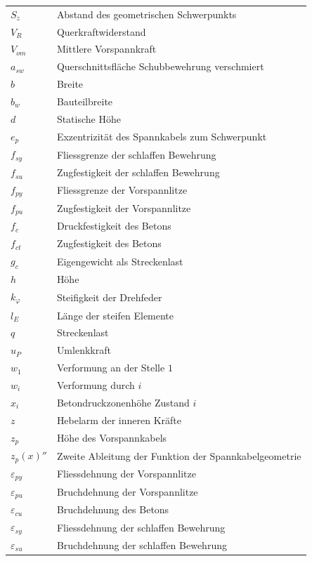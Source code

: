 \documentclass[
  11pt,
  letterpaper,
]{scrreprt}
\begin{document}
\begin{longtable}[]{@{}
  >{\raggedright\arraybackslash}p{}
  >{\raggedright\arraybackslash}p{}@{}}
\(S_{z}\) & Abstand des geometrischen Schwerpunkts \\
\(V_R\) & Querkraftwiderstand \\
\(V_{om}\) & Mittlere Vorspannkraft \\
\(a_{sw}\) & Querschnittsfläche Schubbewehrung verschmiert \\
\(b\) & Breite \\
\(b_w\) & Bauteilbreite \\
\(d\) & Statische Höhe \\
\(e_{p}\) & Exzentrizität des Spannkabels zum Schwerpunkt \\
\(f_{sy}\) & Fliessgrenze der schlaffen Bewehrung \\
\(f_{su}\) & Zugfestigkeit der schlaffen Bewehrung \\
\(f_{py}\) & Fliessgrenze der Vorspannlitze \\
\(f_{pu}\) & Zugfestigkeit der Vorspannlitze \\
\(f_{c}\) & Druckfestigkeit des Betons \\
\(f_{ct}\) & Zugfestigkeit des Betons \\
\(g_c\) & Eigengewicht als Streckenlast \\
\(h\) & Höhe \\
\(k_{\varphi}\) & Steifigkeit der Drehfeder \\
\(l_E\) & Länge der steifen Elemente \\
\(q\) & Streckenlast \\
\(u_P\) & Umlenkkraft \\
\(w_1\) & Verformung an der Stelle \(1\) \\
\(w_i\) & Verformung durch \(i\) \\
\(x_i\) & Betondruckzonenhöhe Zustand \(i\) \\
\(z\) & Hebelarm der inneren Kräfte \\
\(z_p\) & Höhe des Vorspannkabels \\
\(z_p(x)''\) & Zweite Ableitung der Funktion der Spannkabelgeometrie \\
\(\varepsilon_{py}\) & Fliessdehnung der Vorspannlitze \\
\(\varepsilon_{pu}\) & Bruchdehnung der Vorspannlitze \\
\(\varepsilon_{cu}\) & Bruchdehnung des Betons \\
\(\varepsilon_{sy}\) & Fliessdehnung der schlaffen Bewehrung \\
\(\varepsilon_{su}\) & Bruchdehnung der schlaffen Bewehrung \\

\end{longtable}
\end{document}
